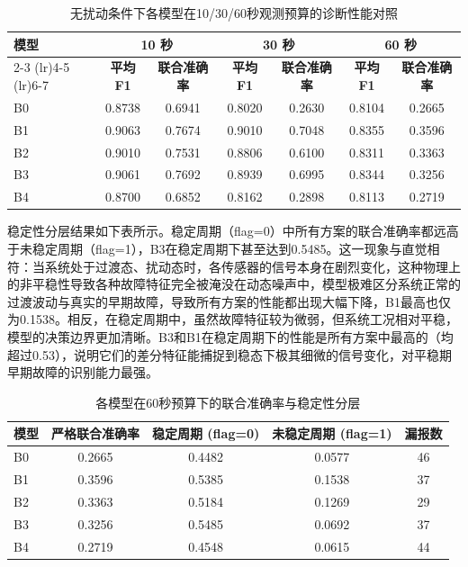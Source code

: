 \documentclass[12pt, a4paper]{ctexart}
\begin{document}
\begin{table}[H]
    \centering
    \caption{无扰动条件下各模型在10/30/60秒观测预算的诊断性能对照}
    \label{tab:clean_budget_compare}
    \small
    \begin{tabular}{lcccccc}
        \toprule
        \multirow{2}{*}{\textbf{模型}} & \multicolumn{2}{c}{\textbf{10 秒}} & \multicolumn{2}{c}{\textbf{30 秒}} & \multicolumn{2}{c}{\textbf{60 秒}} \\
        \cmidrule(lr){2-3} \cmidrule(lr){4-5} \cmidrule(lr){6-7}
                       & \textbf{平均F1} & \textbf{联合准确率} & \textbf{平均 F1} & \textbf{联合准确率} & \textbf{平均F1} & \textbf{联合准确率} \\
        \midrule
        B0             & 0.8738 & 0.6941 & 0.8020 & 0.2630 & 0.8104 & 0.2665 \\
        B1             & 0.9063 & 0.7674 & 0.9010 & 0.7048 & 0.8355 & 0.3596 \\
        B2             & 0.9010 & 0.7531 & 0.8806 & 0.6100 & 0.8311 & 0.3363 \\
        B3             & 0.9061 & 0.7692 & 0.8939 & 0.6995 & 0.8344 & 0.3256 \\
        B4             & 0.8700 & 0.6852 & 0.8162 & 0.2898 & 0.8113 & 0.2719 \\
        \bottomrule
    \end{tabular}
\end{table}
稳定性分层结果如下表所示。稳定周期（flag=0）中所有方案的联合准确率都远高于未稳定周期（flag=1），B3在稳定周期下甚至达到0.5485。这一现象与直觉相符：当系统处于过渡态、扰动态时，各传感器的信号本身在剧烈变化，这种物理上的非平稳性导致各种故障特征完全被淹没在动态噪声中，模型极难区分系统正常的过渡波动与真实的早期故障，导致所有方案的性能都出现大幅下降，B1最高也仅为0.1538。相反，在稳定周期中，虽然故障特征较为微弱，但系统工况相对平稳，模型的决策边界更加清晰。B3和B1在稳定周期下的性能是所有方案中最高的（均超过0.53），说明它们的差分特征能捕捉到稳态下极其细微的信号变化，对平稳期早期故障的识别能力最强。
\begin{table}[H]
    \centering
    \caption{各模型在60秒预算下的联合准确率与稳定性分层}
    \label{tab:joint_acc_60s}
    \begin{tabular}{lcccc}
        \toprule
        \textbf{模型} & \textbf{严格联合准确率} & \textbf{稳定周期 (flag=0)} & \textbf{未稳定周期 (flag=1)} & \textbf{漏报数} \\
        \midrule
        B0           & 0.2665        & 0.4482            & 0.0577           & 46    \\
        B1           & 0.3596        & 0.5385            & 0.1538           & 37    \\
        B2           & 0.3363        & 0.5184            & 0.1269           & 29    \\
        B3           & 0.3256        & 0.5485            & 0.0692           & 37    \\
        B4           & 0.2719        & 0.4548            & 0.0615           & 44    \\
        \bottomrule
    \end{tabular}
\end{table}
\end{document}
